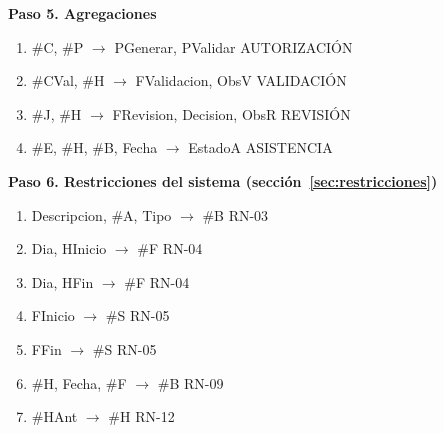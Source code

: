 \textbf{Paso 5. Agregaciones}
\begin{enumerate}[label=f\arabic*,start=33,leftmargin=3em]
  \item \#C, \#P \ensuremath{\to} PGenerar, PValidar \hfill {\small\color{gris}AUTORIZACIÓN}
  \item \#CVal, \#H \ensuremath{\to} FValidacion, ObsV \hfill {\small\color{gris}VALIDACIÓN}
  \item \#J, \#H \ensuremath{\to} FRevision, Decision, ObsR \hfill {\small\color{gris}REVISIÓN}
  \item \#E, \#H, \#B, Fecha \ensuremath{\to} EstadoA \hfill {\small\color{gris}ASISTENCIA}
\end{enumerate}
\textbf{Paso 6. Restricciones del sistema (sección~\ref{sec:restricciones})}
\begin{enumerate}[label=f\arabic*,start=37,leftmargin=3em]
  \item\label{df:RN-03-1} Descripcion, \#A, Tipo \ensuremath{\to} \#B \hfill {\small\color{gris}RN-03}
  \item\label{df:RN-04-1} Dia, HInicio \ensuremath{\to} \#F \hfill {\small\color{gris}RN-04}
  \item\label{df:RN-04-2} Dia, HFin \ensuremath{\to} \#F \hfill {\small\color{gris}RN-04}
  \item\label{df:RN-05-1} FInicio \ensuremath{\to} \#S \hfill {\small\color{gris}RN-05}
  \item\label{df:RN-05-2} FFin \ensuremath{\to} \#S \hfill {\small\color{gris}RN-05}
  \item\label{df:RN-09-1} \#H, Fecha, \#F \ensuremath{\to} \#B \hfill {\small\color{gris}RN-09}
  \item\label{df:RN-12-1} \#HAnt \ensuremath{\to} \#H \hfill {\small\color{gris}RN-12}
\end{enumerate}
